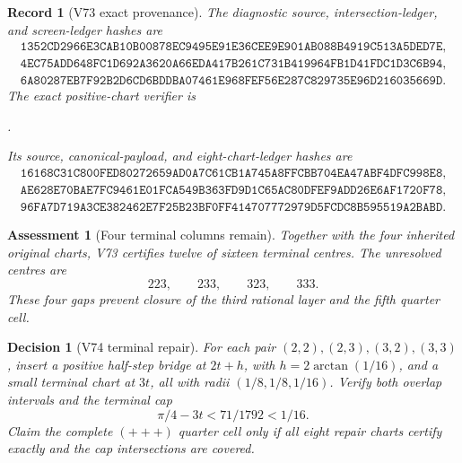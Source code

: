\documentclass[11pt,oneside]{article}
\newtheorem{assessment}[theorem]{Assessment}
\newtheorem{record}[theorem]{Record}
\newtheorem{decision}[theorem]{Decision}
\theoremstyle{definition}
\theoremstyle{remark}
\begin{document}
\begin{record}[V73 exact provenance]
\label{rec:newv73-provenance}
The diagnostic source, intersection-ledger, and screen-ledger hashes
are
\[
\begin{gathered}
\texttt{1352CD2966E3CAB10B00878EC9495E91E36CEE9E901AB088B4919C513A5DED7E},\\
\texttt{4EC75ADD648FC1D692A3620A66EDA417B261C731B419964FB1D41FDC1D3C6B94},\\
\texttt{6A80287EB7F92B2D6CD6BDDBA07461E968FEF56E287C829735E96D216035669D}.
\end{gathered}                                        \tag{73.8}
\]
The exact positive-chart verifier is
\begin{center}
\footnotesize
{}.
\end{center}
Its source, canonical-payload, and eight-chart-ledger hashes are
\[
\begin{gathered}
\texttt{16168C31C800FED80272659AD0A7C61CB1A745A8FFCBB704EA47ABF4DFC998E8},\\
\texttt{AE628E70BAE7FC9461E01FCA549B363FD9D1C65AC80DFEF9ADD26E6AF1720F78},\\
\texttt{96FA7D719A3CE382462E7F25B23BF0FF414707772979D5FCDC8B595519A2BABD}.
\end{gathered}                                        \tag{73.9}
\]
\end{record}

\begin{assessment}[Four terminal columns remain]
\label{ass:newv73}
Together with the four inherited original charts, V73 certifies
twelve of sixteen terminal centres.  The unresolved centres are
\[
 223,\qquad 233,\qquad 323,\qquad 333.
\]
These four gaps prevent closure of the third rational layer and the
fifth quarter cell.
\end{assessment}

\begin{decision}[V74 terminal repair]
\label{dec:newv73-next}
For each pair \((2,2),(2,3),(3,2),(3,3)\), insert a positive
half-step bridge at \(2t+h\), with \(h=2\arctan(1/16)\), and a
small terminal chart at \(3t\), all with radii
\((1/8,1/8,1/16)\).  Verify both overlap intervals and the terminal
cap
\[
 \pi/4-3t<71/1792<1/16.                              \tag{73.10}
\]
Claim the complete \((+++)\) quarter cell only if all eight repair
charts certify exactly and the cap intersections are covered.
\end{decision}
\end{document}
